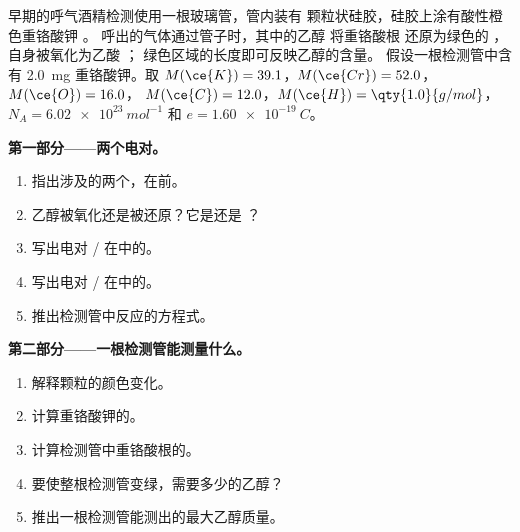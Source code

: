 \begin{problem}
\label{pb:g11:redox:1}
早期的呼气酒精检测使用一根玻璃管，管内装有
颗粒状硅胶，硅胶上涂有酸性橙色重铬酸钾 。
呼出的气体通过管子时，其中的乙醇  将重铬酸根
还原为绿色的  ，自身被氧化为乙酸 ；
绿色区域的长度即可反映乙醇的含量。
假设一根检测管中含有 \qty{2.0}{mg} 重铬酸钾。取
$M(\ce{K}) = 39.1$，$M(\ce{Cr}) = 52.0$，$M(\ce{O}) = 16.0$，
$M(\ce{C}) = 12.0$，$M(\ce{H}) = \qty{1.0}{g/mol}$，$N_A =
\qty{6.02e23}{mol^{-1}}$ 和 $e = \qty{1.60e-19}{C}$。

\medskip
\noindent\textbf{第一部分——两个电对。}
\begin{enumerate}
  \item 指出涉及的两个，在前。
  \item 乙醇被氧化还是被还原？它是还是
        ？
  \item 写出电对
        / 在中的。
  \item 写出电对
        / 在中的。
  \item 推出检测管中反应的方程式。
\end{enumerate}

\medskip
\noindent\textbf{第二部分——一根检测管能测量什么。}
\begin{enumerate}[resume]
  \item 解释颗粒的颜色变化。
  \item 计算重铬酸钾的。
  \item 计算检测管中重铬酸根的。
  \item 要使整根检测管变绿，需要多少的乙醇？
  \item 推出一根检测管能测出的最大乙醇质量。
\end{enumerate}


\end{problem}
